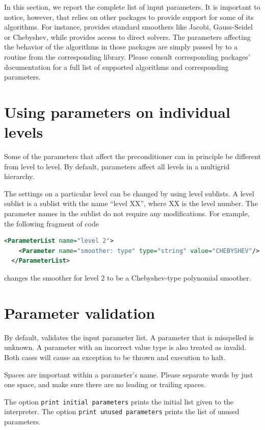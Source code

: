 \label{sec:muelu_options}

In this section, we report the complete list of \muelu{} input parameters.  It
is important to notice, however, that \muelu{} relies on other \trilinos{}
packages to provide support for some of its algorithms. For instance,
\ifpacktwo{} provides standard smoothers like Jacobi, Gauss-Seidel or
Chebyshev, while \amesostwo{} provides access to direct solvers. The
parameters affecting the behavior of the algorithms in those packages are
simply passed by \muelu{} to a routine from the corresponding library. Please
consult corresponding packages' documentation for a full list of supported
algorithms and corresponding parameters.

\section{Using parameters on individual levels}
Some of the parameters that affect the preconditioner can in principle be
different from level to level. By default, parameters affect all levels in
a multigrid hierarchy.

The settings on a particular level can be changed by using level sublists.
A level sublist is a \parameterlist{} sublist with the name ``level XX'', where XX is the level number. The
parameter names in the sublist do not require any modifications. For example,
the following fragment of code
\begin{lstlisting}[language=XML]
  <ParameterList name="level 2">
    <Parameter name="smoother: type" type="string" value="CHEBYSHEV"/>
  </ParameterList>
\end{lstlisting}
changes the smoother for level 2 to be a Chebyshev-type polynomial smoother.

\section{Parameter validation}
By default, \muelu{} validates the input parameter list. A parameter that is
misspelled is unknown. A parameter with an incorrect value type is also treated as invalid.
Both cases will cause an exception to be
thrown and execution to halt.

\begin{mycomment}
Spaces are important within a parameter's name. Please separate words
by just one space, and make sure there are no leading or trailing spaces.
\end{mycomment}

The option \verb|print initial parameters| prints the initial list given to the
interpreter. The option \verb|print unused parameters| prints the list of unused
parameters.

